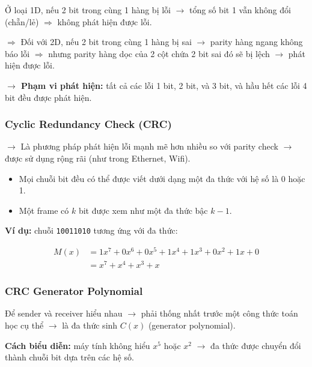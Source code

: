 \noindent
Ở loại 1D, nếu 2 bit trong cùng 1 hàng bị lỗi $\rightarrow$ tổng số bit 1 vẫn không đổi (chẵn/lẻ) $\Rightarrow$ không phát hiện được lỗi.

$\Rightarrow$ Đối với 2D, nếu 2 bit trong cùng 1 hàng bị sai $\rightarrow$ parity hàng ngang không báo lỗi $\Rightarrow$ nhưng parity hàng dọc của 2 cột chứa 2 bit sai đó sẽ bị lệch $\rightarrow$ phát hiện được lỗi.
\medskip

\vspace{0.1cm}

\textbf{$\rightarrow$ Phạm vi phát hiện:} tất cả các lỗi 1 bit, 2 bit, và 3 bit, và hầu hết các lỗi 4 bit đều được phát hiện.
\medskip

\subsubsection{Cyclic Redundancy Check (CRC)}

\noindent
$\rightarrow$ Là phương pháp phát hiện lỗi mạnh mẽ hơn nhiều so với parity check $\rightarrow$ được sử dụng rộng rãi (như trong Ethernet, Wifi).
\medskip

\begin{itemize}
    \item Mọi chuỗi bit đều có thể được viết dưới dạng một đa thức với hệ số là 0 hoặc 1.
    \item Một frame có $k$ bit được xem như một đa thức bậc $k-1$.
\end{itemize}
\medskip

\noindent
\textbf{Ví dụ:} chuỗi \texttt{10011010} tương ứng với đa thức:

\[
\begin{aligned}
M(x) &= 1x^7 + 0x^6 + 0x^5 + 1x^4 + 1x^3 + 0x^2 + 1x + 0 \\
    &= x^7 + x^4 + x^3 + x
\end{aligned}
\]
\medskip

\subsubsection{CRC Generator Polynomial}

\noindent
Để sender và receiver hiểu nhau $\rightarrow$ phải thống nhất trước một công thức toán học cụ thể $\rightarrow$ là đa thức sinh $C(x)$ (generator polynomial).
\medskip

\noindent
\textbf{Cách biểu diễn:} máy tính không hiểu $x^5$ hoặc $x^2$ $\rightarrow$ đa thức được chuyển đổi thành chuỗi bit dựa trên các hệ số.

